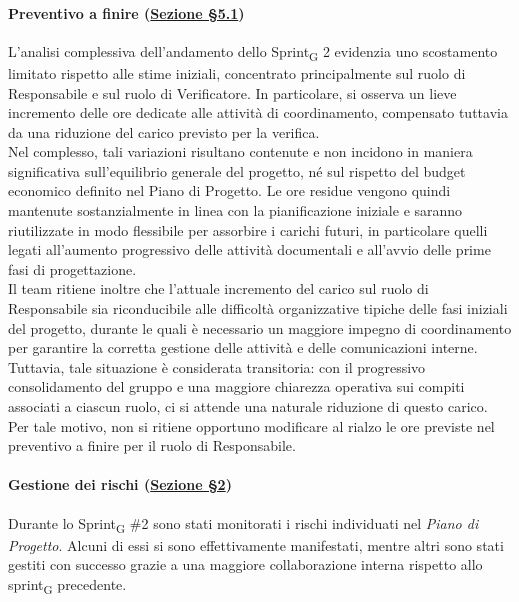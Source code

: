 \documentclass[a4paper, 10pt, colorlinks=true, linkcolor=black, urlcolor=blue, citecolor=blue, hidelinks]{article}
\begin{document}
\paragraph{Preventivo a finire (\hyperref[tab:preventivo-finire]{Sezione \S5.1})}
L’analisi complessiva dell’andamento dello Sprint\textsubscript{G} 2 evidenzia uno scostamento limitato rispetto alle stime iniziali, concentrato principalmente sul ruolo di Responsabile e sul ruolo di Verificatore. In particolare, si osserva un lieve incremento delle ore dedicate alle attività di coordinamento, compensato tuttavia da una riduzione del carico previsto per la verifica.\\
Nel complesso, tali variazioni risultano contenute e non incidono in maniera significativa sull’equilibrio generale del progetto, né sul rispetto del budget economico definito nel Piano di Progetto. Le ore residue vengono quindi mantenute sostanzialmente in linea con la pianificazione iniziale e saranno riutilizzate in modo flessibile per assorbire i carichi futuri, in particolare quelli legati all’aumento progressivo delle attività documentali e all’avvio delle prime fasi di progettazione.\\
Il team ritiene inoltre che l’attuale incremento del carico sul ruolo di Responsabile sia riconducibile alle difficoltà organizzative tipiche delle fasi iniziali del progetto, durante le quali è necessario un maggiore impegno di coordinamento per garantire la corretta gestione delle attività e delle comunicazioni interne. Tuttavia, tale situazione è considerata transitoria: con il progressivo consolidamento del gruppo e una maggiore chiarezza operativa sui compiti associati a ciascun ruolo, ci si attende una naturale riduzione di questo carico. Per tale motivo, non si ritiene opportuno modificare al rialzo le ore previste nel preventivo a finire per il ruolo di Responsabile.

\paragraph{Gestione dei rischi (\hyperref[tab:gestione-rischi]{Sezione \S2})}
Durante lo Sprint\textsubscript{G} \#2 sono stati monitorati i rischi individuati nel \textit{Piano di Progetto}. Alcuni di essi si sono effettivamente manifestati, mentre altri sono stati gestiti con successo grazie a una maggiore collaborazione interna rispetto allo sprint\textsubscript{G} precedente.
\end{document}
